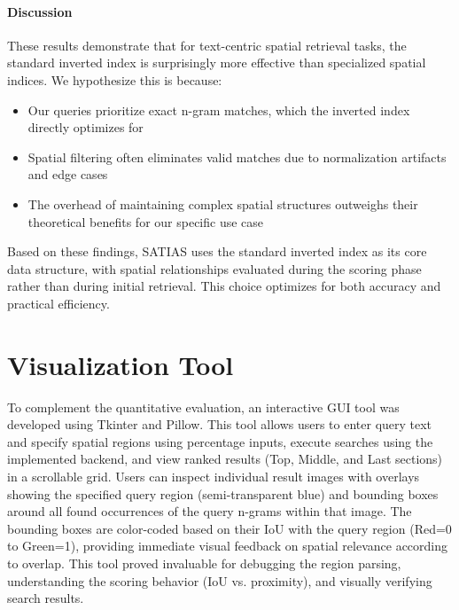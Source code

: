 \documentclass[manuscript,screen]{acmart}
\begin{document}
\paragraph{Discussion} These results demonstrate that for text-centric spatial retrieval tasks, the standard inverted index is surprisingly more effective than specialized spatial indices. We hypothesize this is because:
\begin{itemize}
    \item Our queries prioritize exact n-gram matches, which the inverted index directly optimizes for
    \item Spatial filtering often eliminates valid matches due to normalization artifacts and edge cases
    \item The overhead of maintaining complex spatial structures outweighs their theoretical benefits for our specific use case
\end{itemize}

Based on these findings, SATIAS uses the standard inverted index as its core data structure, with spatial relationships evaluated during the scoring phase rather than during initial retrieval. This choice optimizes for both accuracy and practical efficiency.

\section{Visualization Tool}

To complement the quantitative evaluation, an interactive GUI tool was developed using Tkinter and Pillow. This tool allows users to enter query text and specify spatial regions using percentage inputs, execute searches using the implemented backend, and view ranked results (Top, Middle, and Last sections) in a scrollable grid. Users can inspect individual result images with overlays showing the specified query region (semi-transparent blue) and bounding boxes around all found occurrences of the query n-grams within that image. The bounding boxes are color-coded based on their IoU with the query region (Red=0 to Green=1), providing immediate visual feedback on spatial relevance according to overlap. This tool proved invaluable for debugging the region parsing, understanding the scoring behavior (IoU vs. proximity), and visually verifying search results.
\end{document}
